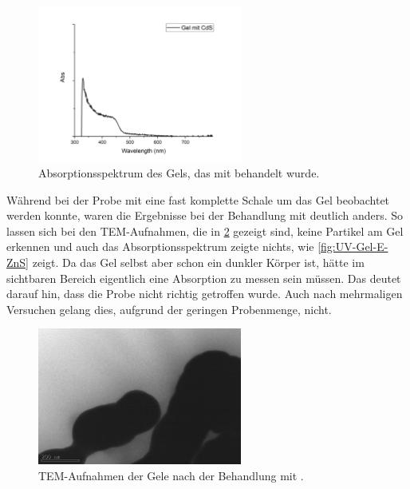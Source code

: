 		\begin{figure}[H]
			\centering
			\includegraphics[width=0.6\textwidth]{Bilder/UV-Gel-E-CdS} 	
			\caption{Absorptionsspektrum des Gels, das mit  behandelt wurde.}
			\label{fig:UV-Gel-E-CdS}
		\end{figure}
	
		Während bei der Probe mit  eine fast komplette Schale um das Gel beobachtet werden konnte, waren die Ergebnisse bei der Behandlung mit  deutlich anders.
		So lassen sich bei den TEM-Aufnahmen, die in \cref{fig:Gel-E-ZnS} gezeigt sind, keine Partikel am Gel erkennen und auch das Absorptionsspektrum zeigte nichts, wie \cref{fig:UV-Gel-E-ZnS} zeigt.
		Da das Gel selbst aber schon ein dunkler Körper ist, hätte im sichtbaren Bereich eigentlich eine Absorption zu messen sein müssen.
		Das deutet darauf hin, dass die Probe nicht richtig getroffen wurde.
		Auch nach mehrmaligen Versuchen gelang dies, aufgrund der geringen Probenmenge, nicht. 
		
		\begin{figure}[H]
			\centering
			\includegraphics[width=0.6\textwidth]{Bilder/Gel-E-ZnS} 	
			\caption{TEM-Aufnahmen der Gele nach der Behandlung mit .}
			\label{fig:Gel-E-ZnS}
		\end{figure}
		
